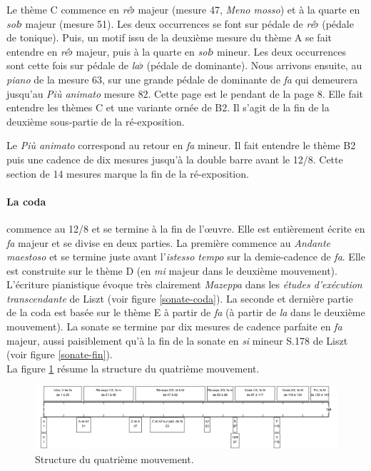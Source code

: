 Le thème C commence en \emph{ré}$\flat$ majeur (mesure 47, \emph{Meno mosso}) et à la quarte en \emph{sol}$\flat$ majeur (mesure 51). Les deux occurrences se font sur pédale de \emph{ré}$\flat$ (pédale de tonique). Puis, un motif issu de la deuxième mesure du thème A se fait entendre en \emph{ré}$\flat$ majeur, puis à la quarte en \emph{sol}$\flat$ mineur. Les deux occurrences sont cette fois sur pédale de \emph{la}$\flat$ (pédale de dominante). Nous arrivons ensuite, au \emph{piano} de la mesure 63, sur une grande pédale de dominante de \emph{fa} qui demeurera jusqu'au \emph{Più animato} mesure 82. Cette page est le pendant de la page 8. Elle fait entendre les thèmes C et une variante ornée de B2. Il s'agit de la fin de la deuxième sous-partie de la ré-exposition.

Le \emph{Più animato} correspond au retour en \emph{fa} mineur. Il fait entendre le thème B2 puis une cadence de dix mesures jusqu'à la double barre avant le 12/8. Cette section de 14 mesures marque la fin de la ré-exposition.

\newpage

\paragraph{La coda} commence au 12/8 et se termine à la fin de l'œuvre. Elle est entièrement écrite en \emph{fa} majeur et se divise en deux parties. La première commence au \emph{Andante maestoso} et se termine juste avant l'\emph{istesso tempo} sur la demie-cadence de \emph{fa}. Elle est construite sur le thème D (en \emph{mi} majeur dans le deuxième mouvement). L'écriture pianistique évoque très clairement \emph{Mazeppa} dans les \emph{études d'exécution transcendante} de Liszt (voir figure \ref{sonate-coda}). La seconde et dernière partie de la coda est basée sur le thème E à partir de \emph{fa} (à partir de \emph{la} dans le deuxième mouvement). La sonate se termine par dix mesures de cadence parfaite en \emph{fa} majeur, aussi paisiblement qu'à la fin de la sonate en \emph{si} mineur S.178 de Liszt (voir figure \ref{sonate-fin}).\\

La figure \ref{schema-4} résume la structure du quatrième mouvement.

\begin{figure}[!ht]
  \begin{bigcenter}
    \includegraphics[width=17.5cm, keepaspectratio]{frise-mvt4.png}
  \end{bigcenter}
  \caption{\label{schema-4}Structure du quatrième mouvement.}
\end{figure}

